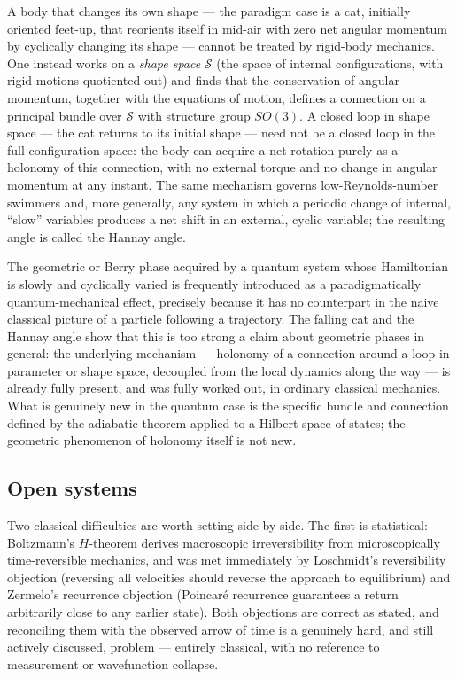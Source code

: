 A body that changes its own shape --- the paradigm case is a cat, initially
oriented feet-up, that reorients itself in mid-air with zero net angular
momentum by cyclically changing its shape --- cannot be treated by rigid-body
mechanics. One instead works on a \emph{shape space} $\mathcal S$ (the space of
internal configurations, with rigid motions quotiented out) and finds that the
conservation of angular momentum, together with the equations of motion,
defines a connection on a principal bundle over $\mathcal S$ with structure
group $SO(3)$. A closed loop in shape space --- the cat returns to its initial
shape --- need not be a closed loop in the full configuration space: the body
can acquire a net rotation purely as a holonomy of this connection, with no
external torque and no change in angular momentum at any instant. The same
mechanism governs low-Reynolds-number swimmers and, more generally, any system
in which a periodic change of internal, ``slow'' variables produces a net shift
in an external, cyclic variable; the resulting angle is called the Hannay angle.

The geometric or Berry phase acquired by a quantum system whose Hamiltonian is
slowly and cyclically varied is frequently introduced as a paradigmatically
quantum-mechanical effect, precisely because it has no counterpart in the naive
classical picture of a particle following a trajectory. The falling cat and the
Hannay angle show that this is too strong a claim about geometric phases in
general: the underlying mechanism --- holonomy of a connection around a loop in
parameter or shape space, decoupled from the local dynamics along the way --- is
already fully present, and was fully worked out, in ordinary classical
mechanics. What is genuinely new in the quantum case is the specific bundle and
connection defined by the adiabatic theorem applied to a Hilbert space of
states; the geometric phenomenon of holonomy itself is not new.

\subsection{Open systems}

Two classical difficulties are worth setting side by side. The first is
statistical: Boltzmann's $H$-theorem derives macroscopic irreversibility from
microscopically time-reversible mechanics, and was met immediately by
Loschmidt's reversibility objection (reversing all velocities should reverse
the approach to equilibrium) and Zermelo's recurrence objection (Poincar\'e
recurrence guarantees a return arbitrarily close to any earlier state). Both
objections are correct as stated, and reconciling them with the observed arrow
of time is a genuinely hard, and still actively discussed, problem --- entirely
classical, with no reference to measurement or wavefunction collapse.

